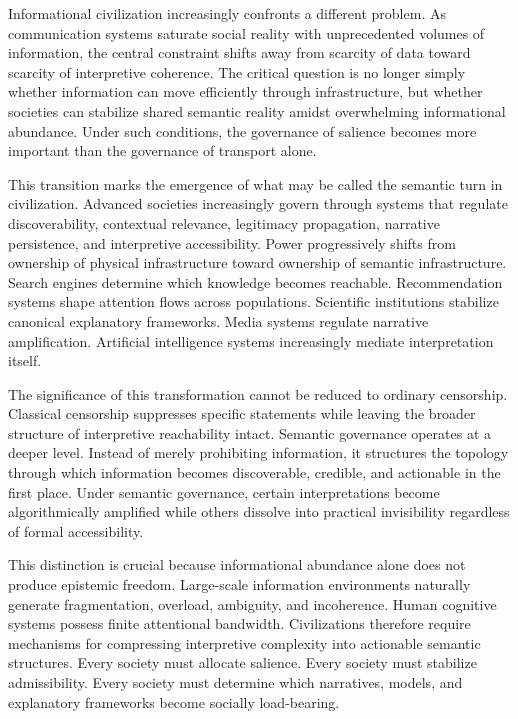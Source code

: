 \documentclass[11pt,a4paper]{article}
\begin{document}
Informational civilization increasingly confronts a different problem. As communication systems saturate social reality with unprecedented volumes of information, the central constraint shifts away from scarcity of data toward scarcity of interpretive coherence. The critical question is no longer simply whether information can move efficiently through infrastructure, but whether societies can stabilize shared semantic reality amidst overwhelming informational abundance. Under such conditions, the governance of salience becomes more important than the governance of transport alone.

This transition marks the emergence of what may be called the semantic turn in civilization. Advanced societies increasingly govern through systems that regulate discoverability, contextual relevance, legitimacy propagation, narrative persistence, and interpretive accessibility. Power progressively shifts from ownership of physical infrastructure toward ownership of semantic infrastructure. Search engines determine which knowledge becomes reachable. Recommendation systems shape attention flows across populations. Scientific institutions stabilize canonical explanatory frameworks. Media systems regulate narrative amplification. Artificial intelligence systems increasingly mediate interpretation itself.

The significance of this transformation cannot be reduced to ordinary censorship. Classical censorship suppresses specific statements while leaving the broader structure of interpretive reachability intact. Semantic governance operates at a deeper level. Instead of merely prohibiting information, it structures the topology through which information becomes discoverable, credible, and actionable in the first place. Under semantic governance, certain interpretations become algorithmically amplified while others dissolve into practical invisibility regardless of formal accessibility.

This distinction is crucial because informational abundance alone does not produce epistemic freedom. Large-scale information environments naturally generate fragmentation, overload, ambiguity, and incoherence. Human cognitive systems possess finite attentional bandwidth. Civilizations therefore require mechanisms for compressing interpretive complexity into actionable semantic structures. Every society must allocate salience. Every society must stabilize admissibility. Every society must determine which narratives, models, and explanatory frameworks become socially load-bearing.
\end{document}
